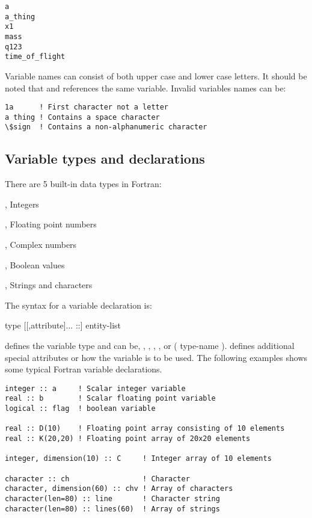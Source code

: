 \begin{lstlisting}
a
a_thing
x1
mass
q123
time_of_flight
\end{lstlisting}

Variable names can consist of both upper case and lower case letters. It should be noted that  and  references the same variable. Invalid variables names can be:

\begin{lstlisting}[texcl]
1a      ! First character not a letter
a thing ! Contains a space character
\$sign  ! Contains a non-alphanumeric character
\end{lstlisting}

\subsection{Variable types and declarations}

There are 5 built-in data types in Fortran:

\begin{xlist}
    \item {}, Integers
    \item {}, Floating point numbers
    \item {}, Complex numbers
    \item {}, Boolean values
    \item {}, Strings and characters
\end{xlist}

The syntax for a variable declaration is:

\begin{fsyntax}
type [[,attribute]... ::] entity-list
\end{fsyntax}

 defines the variable type and can be, , , , , or ( type-name ).  defines additional special attributes or how the variable is to be used. The following examples shows
some typical Fortran variable declarations.

\begin{verbatim}
integer :: a     ! Scalar integer variable
real :: b        ! Scalar floating point variable
logical :: flag  ! boolean variable

real :: D(10)    ! Floating point array consisting of 10 elements
real :: K(20,20) ! Floating point array of 20x20 elements

integer, dimension(10) :: C     ! Integer array of 10 elements

character :: ch                 ! Character
character, dimension(60) :: chv ! Array of characters
character(len=80) :: line       ! Character string
character(len=80) :: lines(60)  ! Array of strings
\end{verbatim}

